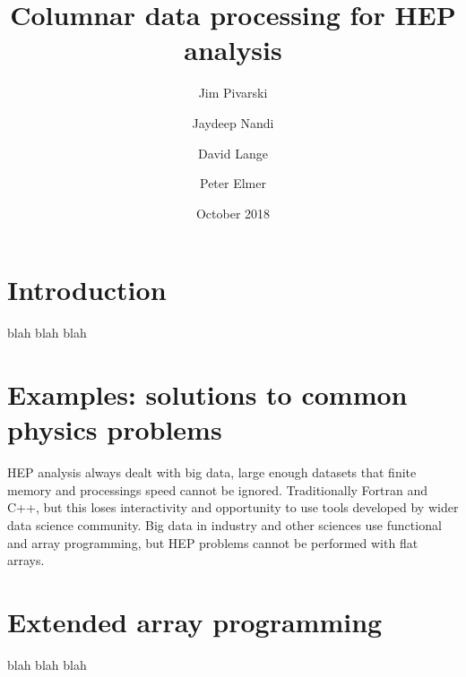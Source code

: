 \documentclass{webofc}
\title{Columnar data processing for HEP analysis}
\author{Jim Pivarski\inst{1} \and Jaydeep Nandi\inst{2} \and David Lange\inst{1} \and Peter Elmer\inst{1}}
\date{October 2018}
\begin{document}

\maketitle


\section{Introduction}

blah blah blah

\section{Examples: solutions to common physics problems}

HEP analysis always dealt with big data, large enough datasets that finite memory and processings speed cannot be ignored. Traditionally Fortran and C++, but this loses interactivity and opportunity to use tools developed by wider data science community. Big data in industry and other sciences use functional and array programming, but HEP problems cannot be performed with flat arrays.

\section{Extended array programming}

blah blah blah
\end{document}
